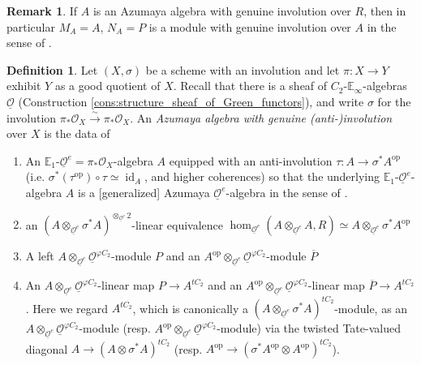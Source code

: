 \documentclass{article}
\DeclareMathOperator{\id}{id} %
\newcommand{\EE}{\mathbb{E}}
\newcommand{\op}{\mathrm{op}} %
\theoremstyle{definition}
\newtheorem{definition}[equation]{Definition}
\newtheorem{remark}[equation]{Remark}
\begin{document}
\begin{remark}\label{rmk:azumaya_geninv_gives_module_geninv}
    If $ A $ is an Azumaya algebra with genuine involution over $ R $, then in particular $ M_A = A $, $ N_A = P $ is a module with genuine involution over $ A $ in the sense of \cite[Definition 3.2.3]{CDHHLMNNSI}. 
\end{remark}
\begin{definition}
    Let $ (X, \sigma) $ be a scheme with an involution and let $ \pi \colon X \to Y $ exhibit $ Y $ as a good quotient of $ X $. 
    Recall that there is a sheaf of $ C_2 $-$ \EE_\infty $-algebras $ \underline{\mathcal{O}} $ (Construction \ref{cons:structure_sheaf_of_Green_functors}), and write $ \sigma $ for the involution $ \pi_* \mathcal{O}_X \xrightarrow{\sim} \pi_* \mathcal{O}_X $. 
    An \emph{Azumaya algebra with genuine (anti-)involution} over $ X $ is the data of 
    \begin{enumerate}[label=(\alph*)]
        \item An $ \EE_1 $-$ \underline{\mathcal{O}}^e = \pi_* \mathcal{O}_X $-algebra $ A $ equipped with an anti-involution $ \tau \colon A \to \sigma^* A^\op $ (i.e. $ \sigma^*(\tau^\op) \circ \tau \simeq \id_A $, and higher coherences) so that the underlying $ \EE_1 $-$ \underline{\mathcal{O}}^e $-algebra $ A $ is a [generalized] Azumaya $ \underline{\mathcal{O}}^e $-algebra in the sense of \cite[Definition 2.11]{MR2957304}. 
        \item \label{defnitem:global_Azumaya_alg_gi_underlying} an $ (A \otimes_{\underline{\mathcal{O}}^e} \sigma^* A)^{\otimes_{\underline{\mathcal{O}}^e} 2} $-linear equivalence $ \hom_{\underline{\mathcal{O}}^e}(A \otimes_{\underline{\mathcal{O}}^e} A, R) \simeq A \otimes_{\underline{\mathcal{O}}^e} \sigma^* A^\op $
        \item A left $ A \otimes_{\underline{\mathcal{O}}^e} \underline{\mathcal{O}}^{\varphi C_2} $-module $ P $ and an $ A^\op \otimes_{\underline{\mathcal{O}}^e} \underline{\mathcal{O}}^{\varphi C_2} $-module $ \overline{P} $
        \item \label{defn_item:global_Azumaya_gen_inv_conn_map} An $ A \otimes_{\underline{\mathcal{O}}^e} {\underline{\mathcal{O}}}^{\varphi C_2} $-linear map $ P \to A^{tC_2} $ and an $ A^\op \otimes_{\underline{\mathcal{O}}^e} {\underline{\mathcal{O}}}^{\varphi C_2} $-linear map $ \overline{P} \to A^{tC_2} $. 
        Here we regard $ A^{tC_2} $, which is canonically a $ (A \otimes_{\underline{\mathcal{O}}^e} \sigma^* A)^{tC_2} $-module, as an $ A \otimes_{\underline{\mathcal{O}}^e} \underline{\mathcal{O}}^{\varphi C_2} $-module (resp. $ A^\op \otimes_{\underline{\mathcal{O}}^e} \underline{\mathcal{O}}^{\varphi C_2} $-module) via the twisted Tate-valued diagonal $ A \to (A \otimes \sigma^* A)^{tC_2} $ (resp. $ A^\op \to (\sigma^* A^\op \otimes A^\op)^{tC_2} $). 

\end{enumerate}
\end{definition}
\end{document}
